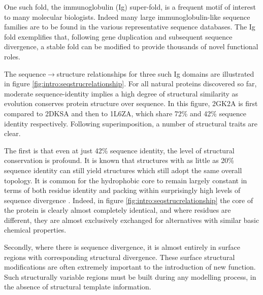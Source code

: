 One such fold, the immunoglobulin\cite{BIOLOGY:Wil88} (Ig) super-fold, is a frequent motif of interest to many molecular biologists. Indeed many large immunoglobulin-like sequence families are to be found in the various  representative sequence databases. The Ig fold exemplifies that, following gene duplication and subsequent sequence divergence, a stable fold can be modified to provide thousands of novel functional roles. 

The sequence$\to$structure relationships for
three such Ig domains are illustrated in figure \ref{fig:intro:seqstrucrelationship}.
For all natural proteins discovered so far, moderate sequence-identity implies
a high degree of  structural similarity as evolution conserves protein structure over sequence\cite{NATIVE:Chothia1986}. 
In this figure, 2GK2A is first compared to 2DKSA and then to 1L6ZA, which share
72\% and 42\% sequence identity respectively. Following superimposition, a number of   structural traits are clear. 

The first is that even at just 42\% sequence identity, the level
of structural conservation is profound. It is known that structures with as little as 20\% sequence identity can still yield structures which still adopt the same overall topology\cite{NATIVE:SUPERFAMILY:2007}.
It is common for the hydrophobic core to
remain largely constant in terms of  both residue identity and packing within surprisingly high levels of sequence divergence \cite{STRUCTURE:Rod98}.
Indeed, in  figure \ref{fig:intro:seqstrucrelationship}
the core of the protein is clearly
almost completely identical, and where residues are different, they are almost
exclusively exchanged for alternatives with similar basic chemical properties.

 
Secondly, where there is sequence divergence, it is almost entirely in surface regions with corresponding structural divergence. These  surface structural modifications
are often extremely important to the
introduction of new function.
Such structurally variable
regions must be built during any modelling process, in the absence of structural template information.

 


